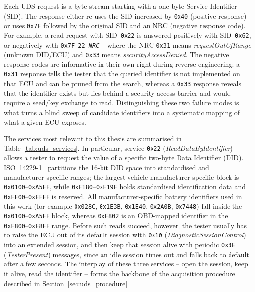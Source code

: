 \documentclass[11pt,a4paper,oneside,parskip=half]{scrreprt}
\newcommand{\udssid}[1]{\texttt{0x#1}}
\providecommand{\hex}{}\renewcommand{\hex}[1]{\texttt{0x#1}}
\begin{document}
Each UDS request is a byte stream starting with a one-byte Service Identifier (SID). The response either re-uses the SID increased by \hex{40} (positive response) or uses \hex{7F} followed by the original SID and an NRC (negative response code). For example, a read request with SID~\hex{22} is answered positively with SID~\hex{62}, or negatively with \hex{7F 22 \textit{NRC}} -- where the NRC \hex{31} means \textit{requestOutOfRange} (unknown DID/ECU) and \hex{33} means \textit{securityAccessDenied}. The negative response codes are informative in their own right during reverse engineering: a \hex{31} response tells the tester that the queried identifier is not implemented on that ECU and can be pruned from the search, whereas a \hex{33} response reveals that the identifier exists but lies behind a security-access barrier and would require a seed/key exchange to read. Distinguishing these two failure modes is what turns a blind sweep of candidate identifiers into a systematic mapping of what a given ECU exposes.

The services most relevant to this thesis are summarised in Table~\ref{tab:uds_services}. In particular, service \udssid{22} (\textit{ReadDataByIdentifier}) allows a tester to request the value of a specific two-byte Data Identifier (DID). ISO~14229-1~\cite{iso14229} partitions the 16-bit DID space into standardised and manufacturer-specific ranges; the largest vehicle-manufacturer-specific block is \hex{0100}--\hex{A5FF}, while \hex{F180}--\hex{F19F} holds standardised identification data and \hex{FF00}--\hex{FFFF} is reserved. All manufacturer-specific battery identifiers used in this work (for example \hex{028C}, \hex{1E3B}, \hex{1E40}, \hex{2A0B}, \hex{7448}) fall inside the \hex{0100}--\hex{A5FF} block, whereas \hex{F802} is an OBD-mapped identifier in the \hex{F800}--\hex{F8FF} range. Before such reads succeed, however, the tester usually has to raise the ECU out of its default session with \hex{10} (\textit{DiagnosticSessionControl}) into an extended session, and then keep that session alive with periodic \hex{3E} (\textit{TesterPresent}) messages, since an idle session times out and falls back to default after a few seconds. The interplay of these three services -- open the session, keep it alive, read the identifier -- forms the backbone of the acquisition procedure described in Section~\ref{sec:uds_procedure}.
\end{document}
